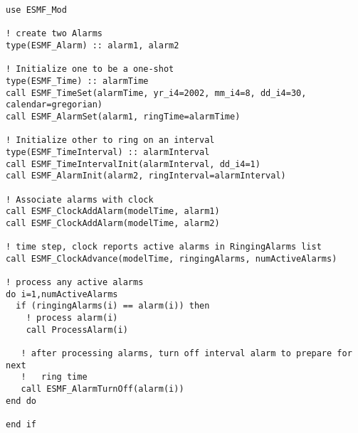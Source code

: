 
\begin{verbatim}
use ESMF_Mod

! create two Alarms
type(ESMF_Alarm) :: alarm1, alarm2

! Initialize one to be a one-shot
type(ESMF_Time) :: alarmTime
call ESMF_TimeSet(alarmTime, yr_i4=2002, mm_i4=8, dd_i4=30, calendar=gregorian)
call ESMF_AlarmSet(alarm1, ringTime=alarmTime)

! Initialize other to ring on an interval
type(ESMF_TimeInterval) :: alarmInterval
call ESMF_TimeIntervalInit(alarmInterval, dd_i4=1)
call ESMF_AlarmInit(alarm2, ringInterval=alarmInterval)

! Associate alarms with clock
call ESMF_ClockAddAlarm(modelTime, alarm1)
call ESMF_ClockAddAlarm(modelTime, alarm2)

! time step, clock reports active alarms in RingingAlarms list
call ESMF_ClockAdvance(modelTime, ringingAlarms, numActiveAlarms)

! process any active alarms
do i=1,numActiveAlarms
  if (ringingAlarms(i) == alarm(i)) then
    ! process alarm(i)
    call ProcessAlarm(i)

   ! after processing alarms, turn off interval alarm to prepare for next
   !   ring time
   call ESMF_AlarmTurnOff(alarm(i))
end do

end if
\end{verbatim}
